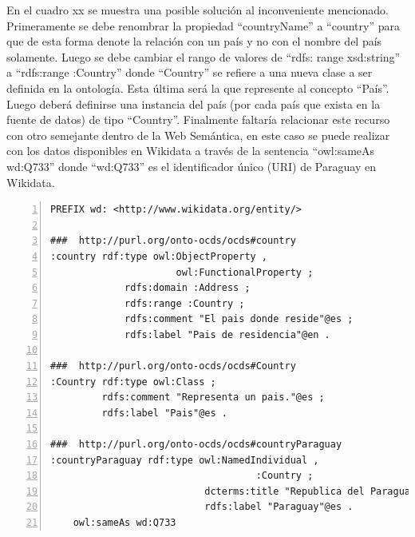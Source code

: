  En el cuadro xx se muestra una posible solución al inconveniente mencionado. Primeramente se debe renombrar la propiedad “countryName” a “country” para que de esta forma denote la relación con un país y no con el nombre del país solamente. Luego se debe cambiar el rango de valores de “rdfs: range xsd:string” a “rdfs:range :Country” donde “Country” se refiere a una nueva clase a ser definida en la ontología. Esta última será la que represente al concepto “País”. Luego deberá definirse una instancia del país (por cada país que exista en la fuente de datos) de tipo “Country”. Finalmente faltaría relacionar este recurso con otro semejante dentro de la Web Semántica, en este caso se puede realizar con los datos disponibles en Wikidata a través de la sentencia “owl:sameAs wd:Q733” donde “wd:Q733” es el identificador único (URI) de Paraguay en Wikidata.

 \begin{lstlisting}[captionpos=b, caption=Información referente al proceso licitatorio cuyo identificacor es, label=lst:caso3-3,  numbers=left,  numberstyle=\tiny\color{mygray},
    basicstyle=\small,frame=single]
PREFIX wd: <http://www.wikidata.org/entity/>

###  http://purl.org/onto-ocds/ocds#country
:country rdf:type owl:ObjectProperty ,
                      owl:FunctionalProperty ;
             rdfs:domain :Address ;
             rdfs:range :Country ;
             rdfs:comment "El pais donde reside"@es ;
             rdfs:label "Pais de residencia"@en .

###  http://purl.org/onto-ocds/ocds#Country
:Country rdf:type owl:Class ;
         rdfs:comment "Representa un pais."@es ;
         rdfs:label "Pais"@es .

###  http://purl.org/onto-ocds/ocds#countryParaguay
:countryParaguay rdf:type owl:NamedIndividual ,
                                    :Country ;
                           dcterms:title "Republica del Paraguay"@es ;
                           rdfs:label "Paraguay"@es .
    owl:sameAs wd:Q733
 \end{lstlisting}

